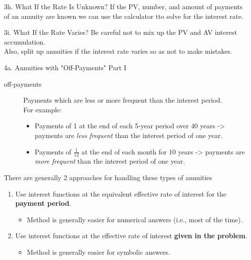 \begin{CHPT_SUMM_AUTO}[label = {L.-3h}]{3h. What If the Rate Is Unknown?}
If the PV, number, and amount of payments of an annuity are known we can use the calculator tto solve for the interest rate.
\end{CHPT_SUMM_AUTO}

\begin{CHPT_SUMM_AUTO}[label = {L.-3i}]{3i. What If the Rate Varies?}
Be careful not to mix up the PV and AV interest accumulation.\\
Also, split up annuities if the interest rate varies so as not to make mistakes.
\end{CHPT_SUMM_AUTO}

\begin{CHPT_SUMM_AUTO}[label = {L.-4a}]{4a. Annuities with "Off-Payments" Part I}
\begin{description}
	\item[off-payments]	Payments which are less or more frequent than the interest period.\\
	For example:
		\begin{itemize}[leftmargin = *]
		\item	Payments of 1 at the end of each 5-year period over 40 years -> payments are \textit{less frequent} than the interest period of one year.
		\item	Payments of $\frac{1}{12}$ at the end of each month for 10 years -> payments are \textit{more frequent} than the interest period of one year.
		\end{itemize}
\end{description}

There are generally 2 approaches for handling these types of annuities
\begin{enumerate}
	\item	Use interest functions at the equivalent effective rate of interest for the \textbf{payment period}.
		\begin{itemize}[leftmargin = *]
		\item	Method is generally easier for numerical answers (i.e., most of the time).
		\end{itemize}
	\item	Use interest functions at the effective rate of interest \textbf{given in the problem}.
		\begin{itemize}[leftmargin = *]
		\item	Method is generally easier for symbolic answers.
		\end{itemize}
\end{enumerate}


\end{CHPT_SUMM_AUTO}
